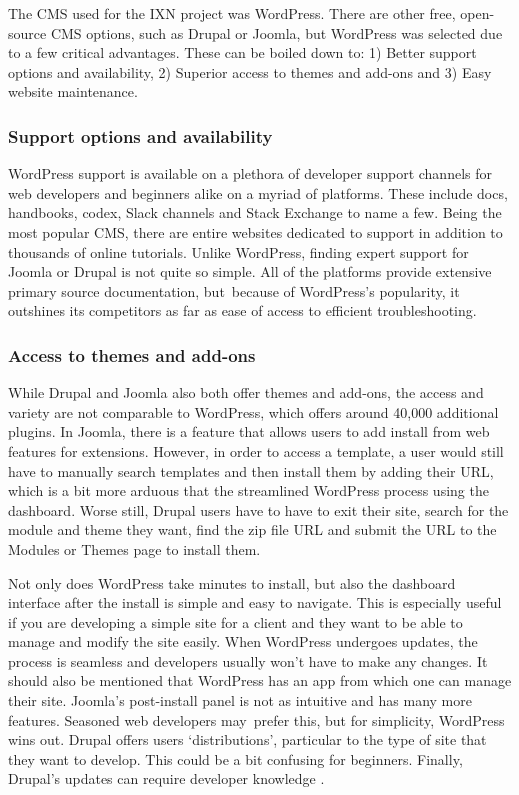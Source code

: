 The CMS used for the IXN project was WordPress. There are other free,
open-source CMS options, such as Drupal or Joomla, but WordPress was
selected due to a few critical advantages. These can be boiled down to:
1) Better support options and availability, 2) Superior access to themes
and add-ons and 3) Easy website maintenance.~

\hypertarget{support-options-and-availability}{%
\subsubsection{Support options and
availability~}\label{support-options-and-availability}}

WordPress support is available on a plethora of developer support
channels for web developers and beginners alike on a myriad of
platforms. These include docs, handbooks, codex, Slack channels and
Stack Exchange to name a few. Being the most popular CMS, there are
entire websites dedicated to support in addition to thousands of online
tutorials. Unlike WordPress, finding expert support for Joomla or Drupal
is not quite so simple. All of the platforms provide extensive primary
source documentation, but~because of WordPress's popularity, it
outshines its competitors as far as ease of access to efficient
troubleshooting.~

\hypertarget{access-to-themes-and-add-ons}{%
\subsubsection{Access to themes and
add-ons~}\label{access-to-themes-and-add-ons}}

While Drupal and Joomla also both offer themes and add-ons, the access
and variety are not comparable to WordPress, which offers around 40,000
additional plugins. In Joomla, there is a feature that allows users to
add install from web features for extensions. However, in order to
access a template, a user would still have to manually search templates
and then install them by adding their URL, which is a bit more arduous
that the streamlined WordPress process using the dashboard. Worse still,
Drupal users have to have to exit their site, search for the module and
theme they want, find the zip file URL and submit the URL to the Modules
or Themes page to install them.~

Not only does WordPress take minutes to install, but also the dashboard
interface after the install is simple and easy to navigate. This is
especially useful if you are developing a simple site for a client and
they want to be able to manage and modify the site easily. When
WordPress undergoes updates, the process is seamless and developers
usually won't have to make any changes. It should also be mentioned that
WordPress has an app from which one can manage their site. Joomla's
post-install panel is not as intuitive and has many more features.
Seasoned web developers may~prefer this, but for simplicity, WordPress
wins out. Drupal offers users `distributions', particular to the type of
site that they want to develop. This could be a bit confusing for
beginners. Finally, Drupal's updates can require developer knowledge
\cite{p2} \cite{p3} \cite{p4} .

